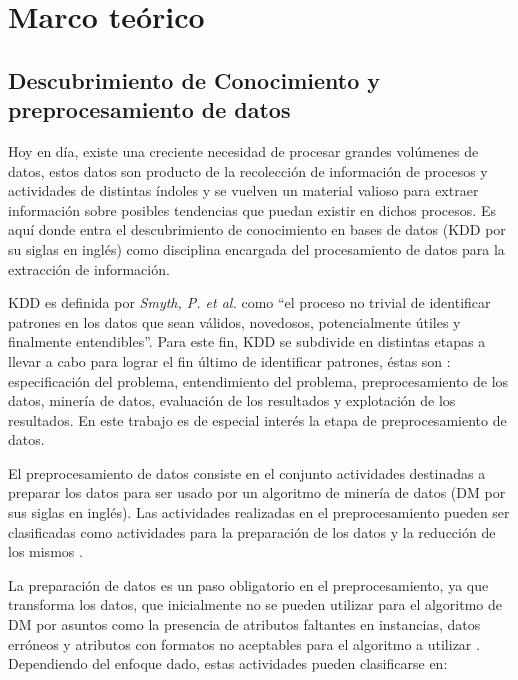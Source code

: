 \chapter{Marco teórico}
\label{capitulo1}

\section{Descubrimiento de Conocimiento y preprocesamiento de datos}

Hoy en día, existe una creciente necesidad de procesar grandes volúmenes de datos, estos datos son producto de la recolección de información de procesos y actividades de distintas índoles y se vuelven un material valioso para extraer información sobre posibles tendencias que puedan existir en dichos procesos. Es aquí donde entra el descubrimiento de conocimiento en bases de datos (KDD por su siglas en inglés) como disciplina encargada del procesamiento de datos para la extracción de información.

KDD es definida por \emph{Smyth, P. et al.} \cite{fayyd1996data} como ``el proceso no trivial de identificar patrones en los datos que sean válidos, novedosos, potencialmente útiles y finalmente entendibles''. Para este fin, KDD se subdivide en distintas etapas a llevar a cabo para lograr el fin último de identificar patrones, éstas son \cite{garcia2016data}: especificación del problema, entendimiento del problema, preprocesamiento de los datos, minería de datos, evaluación de los resultados y explotación de los resultados. En este trabajo es de especial interés la etapa de preprocesamiento de datos.

El preprocesamiento de datos consiste en el conjunto actividades destinadas a preparar los datos para ser usado por un algoritmo de minería de datos (DM por sus siglas en inglés). Las actividades realizadas en el preprocesamiento pueden ser clasificadas como actividades para la preparación de los datos y la reducción de los mismos \cite{garcia2016data}.

La preparación de datos es un paso obligatorio en el preprocesamiento, ya que transforma los datos, que inicialmente no se pueden utilizar para el algoritmo de DM por asuntos como la presencia de atributos faltantes en instancias, datos erróneos y atributos con formatos no aceptables para el algoritmo a utilizar \cite{garcia2016data}. Dependiendo del enfoque dado, estas actividades pueden clasificarse en:

